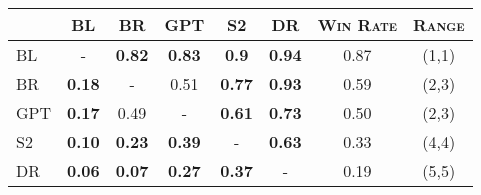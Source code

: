 \begin{tabular}{l|ccccc|cc} 
\hline
\textsc{} & \textsc{BL}& \textsc{BR} &  \textsc{GPT} &  \textsc{S2} & \textsc{DR} & \textsc{Win Rate}& \textsc{Range}\\
\hline 
\textsc{BL}& - & \textbf{0.82} & \textbf{0.83} & \textbf{0.9} & \textbf{0.94} & 0.87 & (1,1)  \\
\textsc{BR}& \textbf{0.18} & - & 0.51 & \textbf{0.77} & \textbf{0.93} & 0.59 & (2,3)  \\
\textsc{GPT}& \textbf{0.17} & 0.49 & - & \textbf{0.61} & \textbf{0.73} & 0.50 & (2,3) \\
\textsc{S2}& \textbf{0.10} & \textbf{0.23} & \textbf{0.39} & - & \textbf{0.63} & 0.33 & (4,4) \\
\textsc{DR}& \textbf{0.06} & \textbf{0.07} & \textbf{0.27} & \textbf{0.37} & - & 0.19  & (5,5)\\
\end{tabular}